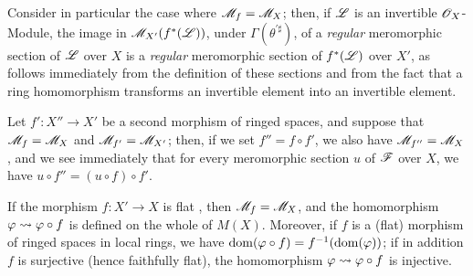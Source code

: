 \begin{env}[20.1.11]
Consider in particular the case where $\mathscr{M}_f=\mathscr{M}_X$; then, if $\mathscr{L}$ is an invertible $\mathscr{O}_X$-Module, the image in $\mathscr{M}_{X'}(f^*(\mathscr{L}))$, under $\Gamma(\theta^{\prime\sharp})$, of a \emph{regular} meromorphic section of $\mathscr{L}$ over $X$  is a \emph{regular} meromorphic section of $f^*(\mathscr{L})$ over $X'$, as follows immediately from the definition of these sections and from the fact that a ring homomorphism transforms an invertible element into an invertible element.

Let $f':X''\to X'$ be a second morphism of ringed spaces, and suppose that $\mathscr{M}_f=\mathscr{M}_X$ and $\mathscr{M}_{f'}=\mathscr{M}_{X'}$; then, if we set $f''=f\circ f'$, we also have $\mathscr{M}_{f''}=\mathscr{M}_X$, and we see immediately that for every meromorphic section $u$ of $\mathscr{F}$ over $X$, we have $u\circ f''=(u\circ f)\circ f'$.
\end{env}

\begin{proposition}[20.1.12]
\label{IV.20.1.12}
If the morphism $f:X'\to X$ is flat , then $\mathscr{M}_f=\mathscr{M}_X$, and the homomorphism $\varphi\leadsto\varphi\circ f$ is defined on the whole of $M(X)$.
Moreover, if $f$ is a (flat) morphism of ringed spaces in local rings, we have $\operatorname{dom}(\varphi\circ f)=f^{-1}(\operatorname{dom}(\varphi))$; if in addition $f$ is surjective (hence faithfully flat), the homomorphism $\varphi\leadsto\varphi\circ f$ is injective.
\end{proposition}

